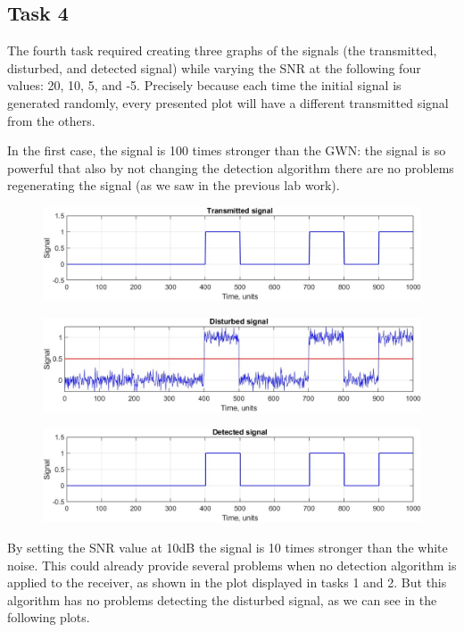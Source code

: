 % 
\subsection*{Task 4}
The fourth task required creating three graphs of the signals (the transmitted, disturbed, and detected signal) while varying the SNR at the following four values: 20, 10, 5, and -5. Precisely because each time the initial signal is generated randomly, every presented plot will have a different transmitted signal from the others.

In the first case, the signal is 100 times stronger than the GWN: the signal is so powerful that also by not changing the detection algorithm there are no problems regenerating the signal (as we saw in the previous lab work).

\begin{figure}[h!]
    \centering
    \includegraphics[width = .85\textwidth]{lab-2/imgs/task4.1_Transmitted.jpg}
\end{figure}
\vspace{-15px}
\begin{figure}[h!]
    \centering
    \includegraphics[width = .85\textwidth]{lab-2/imgs/task4.1_Noise.jpg}
\end{figure}
\vspace{-15px}
\begin{figure}[h!]
    \centering
    \includegraphics[width = .85\textwidth]{lab-2/imgs/task4.1_Detected.jpg}
\end{figure}

\FloatBarrier\noindent By setting the SNR value at 10dB the signal is 10 times stronger than the white noise. This could already provide several problems when no detection algorithm is applied to the receiver, as shown in the plot displayed in tasks 1 and 2. But this algorithm has no problems detecting the disturbed signal, as we can see in the following plots.

